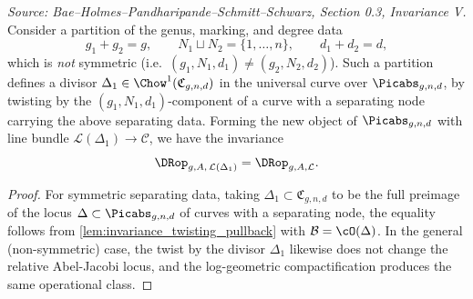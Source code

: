 \begin{lemma}
  \label{lem:invariance_vertical_twisting}
  \textit{Source: Bae--Holmes--Pandharipande--Schmitt--Schwarz, Section 0.3, Invariance V.}
  Consider a partition of the genus, marking, and degree data
  \[
    g_1 + g_2 = g, \qquad N_1 \sqcup N_2 = \{1,\ldots,n\}, \qquad d_1 + d_2 = d,
  \]
  which is \emph{not} symmetric (i.e.\ $(g_1,N_1,d_1) \neq (g_2,N_2,d_2)$).
  Such a partition defines a divisor $\Delta_1 \in \Chow^1(\mathfrak{C}_{g,n,d})$ in the
  universal curve over $\Picabs_{g,n,d}$, by twisting by the $(g_1,N_1,d_1)$-component of a
  curve with a separating node carrying the above separating data.
  Forming the new object of $\Picabs_{g,n,d}$ with line bundle
  $\mathcal{L}(\Delta_1) \to \mathcal{C}$, we have the invariance
  \[
    \DRop_{g,A,\,\mathcal{L}(\Delta_1)} = \DRop_{g,A,\mathcal{L}}.
  \]
\end{lemma}

\begin{proof}
  For symmetric separating data, taking $\Delta_1 \subset \mathfrak{C}_{g,n,d}$ to be the
  full preimage of the locus $\Delta \subset \Picabs_{g,n,d}$ of curves with a separating
  node, the equality follows from \cref{lem:invariance_twisting_pullback} with
  $\mathcal{B} = \cO(\Delta)$.  In the general (non-symmetric) case, the twist by the divisor
  $\Delta_1$ likewise does not change the relative Abel-Jacobi locus, and the log-geometric
  compactification produces the same operational class.
\end{proof}

